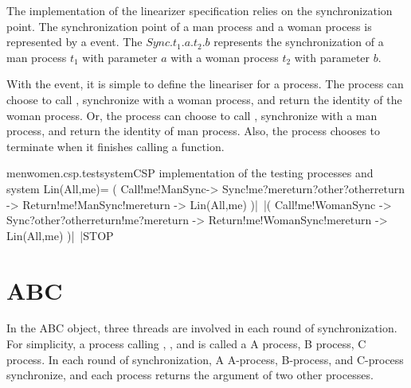 \documentclass{article}
\begin{document}
The implementation of the linearizer specification relies on the synchronization point. The synchronization point of a man process and a woman process is represented by a  event. The $Sync.t_1.a.t_2.b$ represents the synchronization of a man process $t_1$ with parameter $a$ with a woman process $t_2$ with parameter $b$.

With the  event, it is simple to define the lineariser for a process. The process can choose to call , synchronize with a woman process, and return the identity of the woman process. Or, the process can choose to call , synchronize with a man process, and return the identity of man process. Also, the process chooses to terminate when it finishes calling a function.
\begin{cspinline}{menwomen.csp.testsystem}{CSP implementation of the testing processes and system}
Lin(All,me)= (
  Call!me!ManSync->
  Sync!me?mereturn?other?otherreturn ->
  Return!me!ManSync!mereturn ->
  Lin(All,me)
)|~|(
  Call!me!WomanSync ->
  Sync?other?otherreturn!me?mereturn ->
  Return!me!WomanSync!mereturn ->
  Lin(All,me)
)|~|STOP
\end{cspinline}

\section{ABC}
In the ABC object, three threads are involved in each round of synchronization. For simplicity, a process calling , , and  is called a A process, B process, C process. In each round of synchronization, A A-process, B-process, and C-process synchronize, and each process returns the argument of two other processes. 
\end{document}
